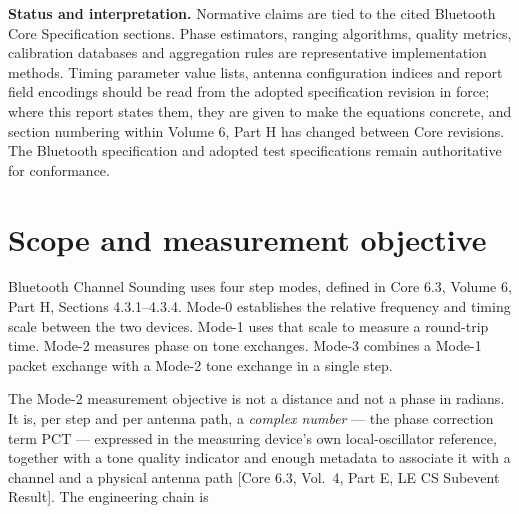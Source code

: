 \documentclass[11pt,a4paper]{article}
\newcommand{\PCT}{\mathrm{PCT}}
\newcommand{\core}[1]{\textcolor{rulegrey}{\small[Core 6.3, #1]}}
\begin{document}
\begin{callout}
\textbf{Status and interpretation.} Normative claims are tied to the cited Bluetooth Core
Specification sections. Phase estimators, ranging algorithms, quality metrics, calibration databases
and aggregation rules are representative implementation methods. Timing parameter value lists,
antenna configuration indices and report field encodings should be read from the adopted
specification revision in force; where this report states them, they are given to make the equations
concrete, and section numbering within Volume 6, Part H has changed between Core revisions. The
Bluetooth specification and adopted test specifications remain authoritative for conformance.
\end{callout}

\newpage
\tableofcontents
\newpage
{}
\setcounter{page}{1}

\section{Scope and measurement objective}

Bluetooth Channel Sounding uses four step modes, defined in Core 6.3, Volume 6, Part H,
Sections 4.3.1--4.3.4. Mode-0 establishes the relative frequency and timing scale between the two
devices. Mode-1 uses that scale to measure a round-trip time. Mode-2 measures phase on tone
exchanges. Mode-3 combines a Mode-1 packet exchange with a Mode-2 tone exchange in a single step.

The Mode-2 measurement objective is not a distance and not a phase in radians. It is, per step and
per antenna path, a \emph{complex number} --- the phase correction term $\PCT$ --- expressed in the
measuring device's own local-oscillator reference, together with a tone quality indicator and enough
metadata to associate it with a channel and a physical antenna path
\core{Vol.\ 4, Part E, LE CS Subevent Result}. The engineering chain is
\end{document}
